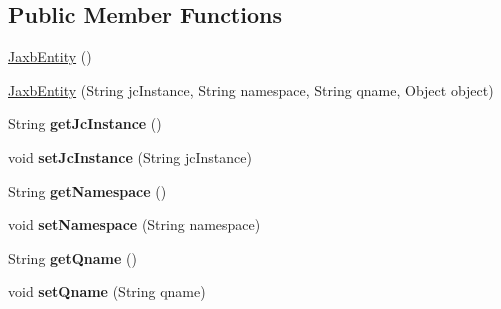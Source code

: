 \subsection*{Public Member Functions}
\begin{DoxyCompactItemize}
\item 
\hyperlink{classcom_1_1bluevia_1_1commons_1_1data_1_1JaxbEntity_aca4acbca2b7ce05749431d32bbef1924}{JaxbEntity} ()
\item 
\hyperlink{classcom_1_1bluevia_1_1commons_1_1data_1_1JaxbEntity_ac4d90a4a0ad298967d220eed2ef6f7d9}{JaxbEntity} (String jcInstance, String namespace, String qname, Object object)
\item 
\hypertarget{classcom_1_1bluevia_1_1commons_1_1data_1_1JaxbEntity_a955c13c56b1b9b27e1cfc1a0c565a16b}{
String {\bfseries getJcInstance} ()}
\label{classcom_1_1bluevia_1_1commons_1_1data_1_1JaxbEntity_a955c13c56b1b9b27e1cfc1a0c565a16b}

\item 
\hypertarget{classcom_1_1bluevia_1_1commons_1_1data_1_1JaxbEntity_a959d5ef64db9bb74a7a3e7265feb74de}{
void {\bfseries setJcInstance} (String jcInstance)}
\label{classcom_1_1bluevia_1_1commons_1_1data_1_1JaxbEntity_a959d5ef64db9bb74a7a3e7265feb74de}

\item 
\hypertarget{classcom_1_1bluevia_1_1commons_1_1data_1_1JaxbEntity_a44cb5477928a676c06afd526f9994398}{
String {\bfseries getNamespace} ()}
\label{classcom_1_1bluevia_1_1commons_1_1data_1_1JaxbEntity_a44cb5477928a676c06afd526f9994398}

\item 
\hypertarget{classcom_1_1bluevia_1_1commons_1_1data_1_1JaxbEntity_a790e9afd96aafc3c0a3ee03ca9c7db6d}{
void {\bfseries setNamespace} (String namespace)}
\label{classcom_1_1bluevia_1_1commons_1_1data_1_1JaxbEntity_a790e9afd96aafc3c0a3ee03ca9c7db6d}

\item 
\hypertarget{classcom_1_1bluevia_1_1commons_1_1data_1_1JaxbEntity_af5dcd8a704f59cef95e25f9d90b9c068}{
String {\bfseries getQname} ()}
\label{classcom_1_1bluevia_1_1commons_1_1data_1_1JaxbEntity_af5dcd8a704f59cef95e25f9d90b9c068}

\item 
\hypertarget{classcom_1_1bluevia_1_1commons_1_1data_1_1JaxbEntity_a9f7c01a403007cf8109308d83d0236f1}{
void {\bfseries setQname} (String qname)}
\label{classcom_1_1bluevia_1_1commons_1_1data_1_1JaxbEntity_a9f7c01a403007cf8109308d83d0236f1}


\end{DoxyCompactItemize}
